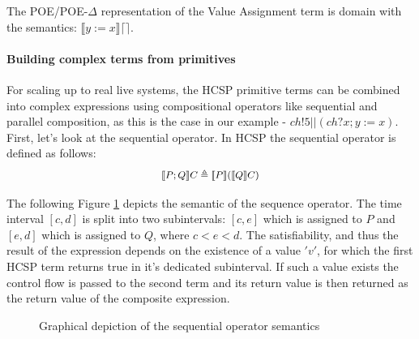 \documentclass[runningheads,a4paper]{llncs}
\begin{document}
The POE/POE-$\Delta$ representation of the Value Assignment term is
 domain with the semantics: $\llbracket
y := x\rrbracket \lceil \rceil$.

\paragraph{Building complex terms from primitives}
For scaling up to real live systems, the HCSP primitive terms can be
combined into complex expressions using compositional operators like
sequential and parallel composition, as this is the case in our
example - $ch!5 || (ch?x; y := x)$.  First, let's look at the
sequential operator. In HCSP the sequential operator is defined as
follows:
\[\footnotesize\begin{array}{rcll}
                 \llbracket P; Q \rrbracket C \triangleq \llbracket P \rrbracket(\llbracket Q \rrbracket C)
               \end{array}\]

             The following Figure \ref{fig:Sequence} depicts the
             semantic of the sequence operator. The time interval
             $[c, d]$ is split into two subintervals: $[c, e]$ which
             is assigned to $P$ and $[e, d]$ which is assigned to $Q$,
             where $c < e < d$.  The satisfiability, and thus the
             result of the expression depends on the existence of a
             value $'v'$, for which the first HCSP term returns true
             in it's dedicated subinterval. If such a value exists the
             control flow is passed to the second term and its return
             value is then returned as the return value of the
             composite expression.

\begin{figure}[hbt]
  \caption{Graphical depiction of the sequential operator semantics}
  \label{fig:Sequence}
\end{figure}
\end{document}
